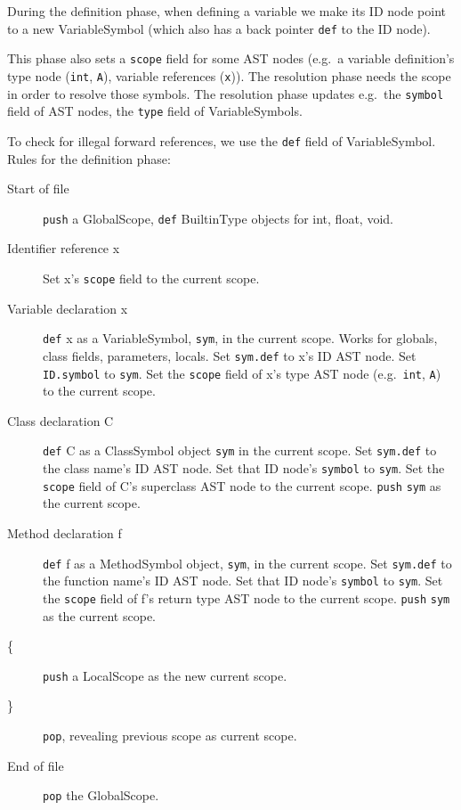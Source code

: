 During the definition phase,
when defining a variable we make its ID node point to a new VariableSymbol
(which also has a back pointer \verb=def= to the ID node).

This phase also sets a \verb=scope= field for some AST nodes
(e.g.\ a variable definition's type node (\verb=int=, \verb=A=),
variable references (\verb=x=)).
The resolution phase needs the scope in order to resolve those symbols.
The resolution phase updates e.g.\ the \verb=symbol= field of AST nodes,
the \verb=type= field of VariableSymbols.

To check for illegal forward references,
we use the \verb=def= field of VariableSymbol.
Rules for the definition phase:

\begin{description}
\item[Start of file]
\verb=push= a GlobalScope, \verb=def= BuiltinType objects for int, float, void.

\item[Identifier reference x]
Set x's \verb=scope= field to the current scope.

\item[Variable declaration x]
\verb=def= x as a VariableSymbol, \verb=sym=, in the current scope.
Works for globals, class fields, parameters, locals.
Set \verb=sym.def= to x's ID AST node.
Set \verb=ID.symbol= to \verb=sym=.
Set the \verb=scope= field of x's type AST node (e.g.\ \verb=int=, \verb=A=)
to the current scope.

\item[Class declaration C]
\verb=def= C as a ClassSymbol object \verb=sym= in the current scope.
Set \verb=sym.def= to the class name's ID AST node.
Set that ID node's \verb=symbol= to \verb=sym=.
Set the \verb=scope= field of C's superclass AST node to the current scope.
\verb=push= \verb=sym= as the current scope.

\item[Method declaration f]
\verb=def= f as a MethodSymbol object, \verb=sym=, in the current scope.
Set \verb=sym.def= to the function name's ID AST node.
Set that ID node's \verb=symbol= to \verb=sym=.
Set the \verb=scope= field of f's return type AST node to the current scope.
\verb=push= \verb=sym= as the current scope.

\item[\{]
\verb=push= a LocalScope as the new current scope.

\item[\}]
\verb=pop=, revealing previous scope as current scope.

\item[End of file]
\verb=pop= the GlobalScope.
\end{description}

